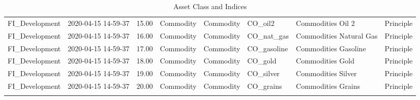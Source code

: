 \begin{longtable}{llrlllll}
  FI\_Development & 2020-04-15 14-59-37 & 15.00 & Commodity & Commodity & CO\_oil2 & Commodities Oil 2 & Principle \\ 
  FI\_Development & 2020-04-15 14-59-37 & 16.00 & Commodity & Commodity & CO\_nat\_gas & Commodities Natural Gas & Principle \\ 
  FI\_Development & 2020-04-15 14-59-37 & 17.00 & Commodity & Commodity & CO\_gasoline & Commodities Gasoline & Principle \\ 
  FI\_Development & 2020-04-15 14-59-37 & 18.00 & Commodity & Commodity & CO\_gold & Commodities Gold & Principle \\ 
  FI\_Development & 2020-04-15 14-59-37 & 19.00 & Commodity & Commodity & CO\_silver & Commodities Silver & Principle \\ 
  FI\_Development & 2020-04-15 14-59-37 & 20.00 & Commodity & Commodity & CO\_grains & Commodities Grains & Principle \\ 
   \hline
\hline
\caption{Asset Class and Indices} 
\end{longtable}

